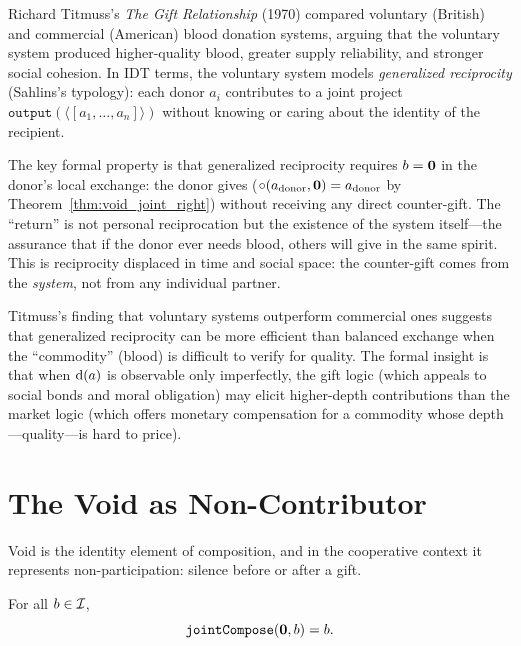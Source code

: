 \begin{example}
\label{ex:titmuss}
Richard Titmuss's \textit{The Gift Relationship} (1970) compared
voluntary (British) and commercial (American) blood donation systems,
arguing that the voluntary system produced higher-quality blood,
greater supply reliability, and stronger social cohesion.  In IDT
terms, the voluntary system models \emph{generalized reciprocity}
(Sahlins's typology): each donor $a_i$ contributes to a joint project
$\texttt{output}(\langle [a_1, \ldots, a_n] \rangle)$ without knowing
or caring about the identity of the recipient.

The key formal property is that generalized reciprocity requires
$b = \mathbf{0}$ in the donor's local exchange: the donor gives
($\circ(a_{\text{donor}}, \mathbf{0}) = a_{\text{donor}}$ by
Theorem~\ref{thm:void_joint_right}) without receiving any direct
counter-gift.  The ``return'' is not personal reciprocation but the
existence of the system itself---the assurance that if the donor ever
needs blood, others will give in the same spirit.  This is reciprocity
displaced in time and social space: the counter-gift comes from the
\emph{system}, not from any individual partner.

Titmuss's finding that voluntary systems outperform commercial ones
suggests that generalized reciprocity can be more efficient than
balanced exchange when the ``commodity'' (blood) is difficult to verify
for quality.  The formal insight is that when $\operatorname{d}(a)$ is
observable only imperfectly, the gift logic (which appeals to social
bonds and moral obligation) may elicit higher-depth contributions than
the market logic (which offers monetary compensation for a commodity
whose depth---quality---is hard to price).
\end{example}

\section{The Void as Non-Contributor}
\label{sec:ch16-void}

Void is the identity element of composition, and in the cooperative context
it represents non-participation: silence before or after a gift.

\begin{theorem}
\label{thm:void_joint_left}
For all $b \in \mathcal{I}$,
\[
  \texttt{jointCompose}(\mathbf{0}, b) = b.
\]
\end{theorem}

